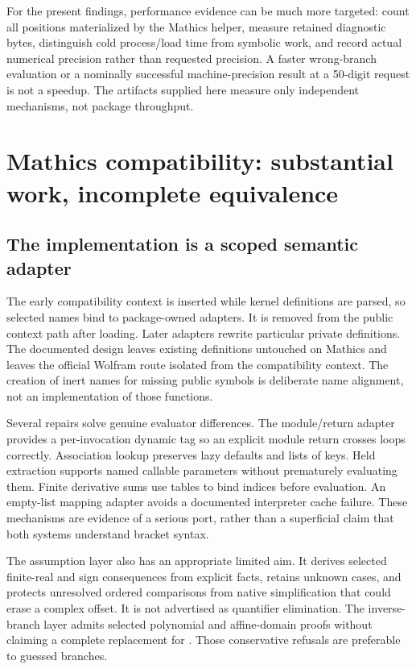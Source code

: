 \documentclass[11pt,letterpaper]{article}
\newcommand{\code}[1]{\texttt{\detokenize{#1}}}
\begin{document}
For the present findings, performance evidence can be much more targeted: count all positions materialized by the Mathics \code{FirstPosition} helper, measure retained diagnostic bytes, distinguish cold process/load time from symbolic work, and record actual numerical precision rather than requested precision. A faster wrong-branch evaluation or a nominally successful machine-precision result at a 50-digit request is not a speedup. The artifacts supplied here measure only independent mechanisms, not package throughput.

\section{Mathics compatibility: substantial work, incomplete equivalence}
\subsection{The implementation is a scoped semantic adapter}

The early compatibility context is inserted while kernel definitions are parsed, so selected names bind to package-owned adapters. It is removed from the public context path after loading. Later adapters rewrite particular private definitions. The documented design leaves existing \code{System} definitions untouched on Mathics and leaves the official Wolfram route isolated from the compatibility context. The creation of inert \code{System} names for missing public symbols is deliberate name alignment, not an implementation of those functions.\cite{core,mathics-compat,mathics-doc}

Several repairs solve genuine evaluator differences. The module/return adapter provides a per-invocation dynamic tag so an explicit module return crosses loops correctly. Association lookup preserves lazy defaults and lists of keys. Held extraction supports named callable parameters without prematurely evaluating them. Finite derivative sums use tables to bind indices before evaluation. An empty-list mapping adapter avoids a documented interpreter cache failure. These mechanisms are evidence of a serious port, rather than a superficial claim that both systems understand bracket syntax.\cite{mathics-compat,mathics-calls,mathics-calculus,mathics-lists}

The assumption layer also has an appropriate limited aim. It derives selected finite-real and sign consequences from explicit facts, retains unknown cases, and protects unresolved ordered comparisons from native simplification that could erase a complex offset. It is not advertised as quantifier elimination. The inverse-branch layer admits selected polynomial and affine-domain proofs without claiming a complete replacement for \code{Reduce}. Those conservative refusals are preferable to guessed branches.\cite{mathics-assumptions,mathics-simplification,mathics-branches}
\end{document}

